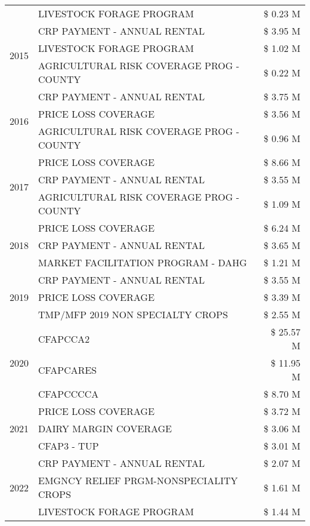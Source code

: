 \begin{tabular}{llr}
 & LIVESTOCK FORAGE PROGRAM & \$ 0.23 M \\
\cline{1-3}
\multirow[t]{3}{*}{2015} & CRP PAYMENT - ANNUAL RENTAL & \$ 3.95 M \\
 & LIVESTOCK FORAGE PROGRAM & \$ 1.02 M \\
 & AGRICULTURAL RISK COVERAGE PROG - COUNTY & \$ 0.22 M \\
\cline{1-3}
\multirow[t]{3}{*}{2016} & CRP PAYMENT - ANNUAL RENTAL & \$ 3.75 M \\
 & PRICE LOSS COVERAGE & \$ 3.56 M \\
 & AGRICULTURAL RISK COVERAGE PROG - COUNTY & \$ 0.96 M \\
\cline{1-3}
\multirow[t]{3}{*}{2017} & PRICE LOSS COVERAGE & \$ 8.66 M \\
 & CRP PAYMENT - ANNUAL RENTAL & \$ 3.55 M \\
 & AGRICULTURAL RISK COVERAGE PROG - COUNTY & \$ 1.09 M \\
\cline{1-3}
\multirow[t]{3}{*}{2018} & PRICE LOSS COVERAGE & \$ 6.24 M \\
 & CRP PAYMENT - ANNUAL RENTAL & \$ 3.65 M \\
 & MARKET FACILITATION PROGRAM - DAHG & \$ 1.21 M \\
\cline{1-3}
\multirow[t]{3}{*}{2019} & CRP PAYMENT - ANNUAL RENTAL & \$ 3.55 M \\
 & PRICE LOSS COVERAGE & \$ 3.39 M \\
 & TMP/MFP 2019 NON SPECIALTY CROPS & \$ 2.55 M \\
\cline{1-3}
\multirow[t]{3}{*}{2020} & CFAPCCA2 & \$ 25.57 M \\
 & CFAPCARES & \$ 11.95 M \\
 & CFAPCCCCA & \$ 8.70 M \\
\cline{1-3}
\multirow[t]{3}{*}{2021} & PRICE LOSS COVERAGE & \$ 3.72 M \\
 & DAIRY MARGIN COVERAGE & \$ 3.06 M \\
 & CFAP3 - TUP & \$ 3.01 M \\
\cline{1-3}
\multirow[t]{3}{*}{2022} & CRP PAYMENT - ANNUAL RENTAL & \$ 2.07 M \\
 & EMGNCY RELIEF PRGM-NONSPECIALITY CROPS & \$ 1.61 M \\
 & LIVESTOCK FORAGE PROGRAM & \$ 1.44 M \\
\cline{1-3}
\bottomrule
\end{tabular}
